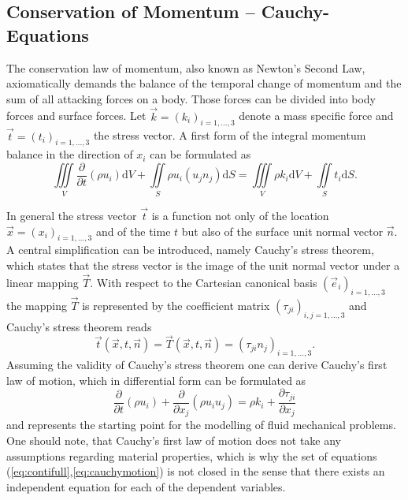     \subsection{Conservation of Momentum -- Cauchy-Equations}

    The conservation law of momentum, also known as Newton's Second Law, axiomatically demands the balance of the temporal change of momentum and the sum of all attacking forces on a body. Those forces can be divided into body forces and surface forces. Let \(\vec{k} = \left( k_i \right)_{i=1,\dots,3}\) denote a mass specific force and \(\vec{t} = \left(t_i\right)_{i=1,\dots,3}\) the stress vector. A first form of the integral momentum balance in the direction of \(x_i\) can be formulated as
    \begin{equation}
      \label{eq:cauchy}
      \iiint\limits_V \frac{\partial }{\partial t}\left(\rho u_i \right) \mathrm{d}V + \iint\limits_S \rho u_i \left( u_j n_j \right) \mathrm{d}S = \iiint\limits_V \rho k_i \mathrm{d}V + \iint\limits_S t_i \mathrm{d}S.
    \end{equation}

    In general the stress vector \(\vec{t}\) is a function not only of the location \(\vec{x} = \left( x_i \right)_{i = 1,\dots,3}\) and of the time \(t\) but also of the surface unit normal vector \(\vec{n}\). A central simplification can be introduced, namely Cauchy's stress theorem, which states that the stress vector is the image of the unit normal vector under a linear mapping \(\vec{T}\). With respect to the Cartesian canonical basis \(\left(\vec{e}_i \right)_{i = 1, \dots, 3}\) the mapping \(\vec{T}\) is represented by the coefficient matrix \( \left(\tau_{ji}\right)_{i,j = 1,\dots,3}\) and Cauchy's stress theorem reads
    \begin{displaymath}
      \vec{t}\left(\vec{x},t,\vec{n}\right) = \vec{T}(\vec{x},t,\vec{n}) = \left(\tau_{ji} n_j\right)_{i = 1, \dots, 3}.
    \end{displaymath}
    Assuming the validity of Cauchy's stress theorem one can derive Cauchy's first law of motion, which in differential form can be formulated as
    \begin{equation}
      \label{eq:cauchymotion}
      \frac{\partial }{\partial t} \left(\rho u_i \right)
      + \frac{\partial}{\partial x_j}\left( \rho u_i u_j \right) 
      = \rho k_i + \frac{\partial \tau_{ji}}{\partial x_j}
    \end{equation}
    and represents the starting point for the modelling of fluid mechanical problems. One should note, that Cauchy's first law of motion does not take any assumptions regarding material properties, which is why the set of equations (\ref{eq:contifull},\ref{eq:cauchymotion}) is not closed in the sense that there exists an independent equation for each of the dependent variables.

